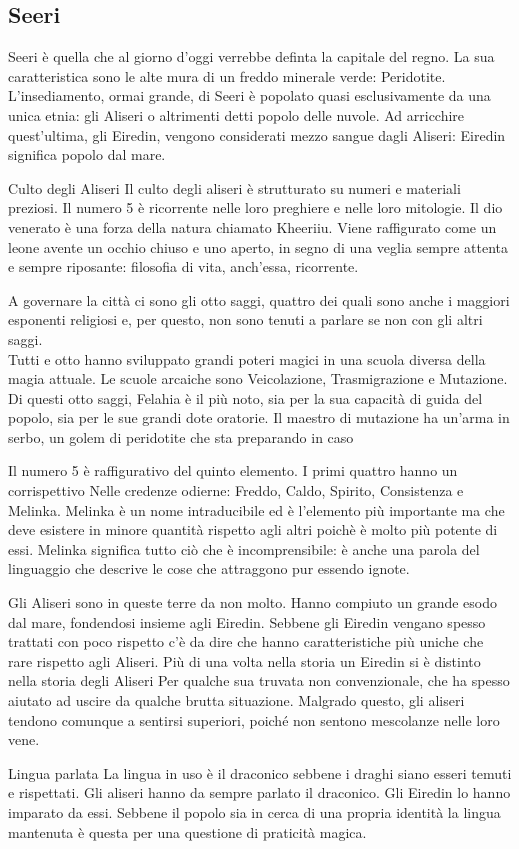 \subsection{Seeri}
Seeri \`e quella che al giorno d'oggi verrebbe definta la capitale del regno.
La sua caratteristica sono le alte mura di un freddo minerale verde: Peridotite.
L'insediamento, ormai grande, di Seeri \`e popolato quasi esclusivamente da una unica etnia:
gli Aliseri o altrimenti detti popolo delle nuvole.
Ad arricchire quest'ultima, gli Eiredin, vengono considerati mezzo sangue
dagli Aliseri: Eiredin significa popolo dal mare.
\begin{commentbox}{Culto degli Aliseri}
  Il culto degli aliseri \`e strutturato su numeri e materiali preziosi. Il numero 5 \`e
  ricorrente nelle loro preghiere e nelle loro mitologie. Il dio venerato \`e una forza
  della natura chiamato Kheeriiu. Viene raffigurato come un leone avente un occhio chiuso
  e uno aperto, in segno di una veglia sempre attenta e sempre riposante: filosofia di vita,
  anch'essa, ricorrente.
\end{commentbox}
A governare la citt\`a ci sono gli otto saggi, quattro dei quali sono anche i maggiori esponenti
religiosi e, per questo, non sono tenuti a parlare se non con gli altri saggi.\\
Tutti e otto hanno sviluppato grandi poteri magici in una scuola diversa della magia attuale.
Le scuole arcaiche sono Veicolazione, Trasmigrazione e Mutazione.
Di questi otto saggi, Felahia \`e il pi\`u noto, sia per la sua capacit\`a di guida
del popolo, sia per le sue grandi dote oratorie.
Il maestro di mutazione ha un'arma in serbo, un golem di peridotite che sta preparando
in caso 
\begin{commentbox}{5}
  Il numero 5 \`e raffigurativo del quinto elemento. I primi quattro hanno un corrispettivo
  Nelle credenze odierne: Freddo, Caldo, Spirito, Consistenza e Melinka.
  Melinka \`e un nome intraducibile ed \`e l'elemento pi\`u importante ma che deve esistere
  in minore quantit\`a rispetto agli altri poich\`e \`e molto pi\`u potente di essi.
  Melinka significa tutto ci\`o che \`e incomprensibile: \`e anche una parola del
  linguaggio che descrive le cose che attraggono pur essendo ignote.
\end{commentbox}
Gli Aliseri sono in queste terre da non molto. Hanno compiuto un grande esodo dal mare,
fondendosi insieme agli Eiredin. Sebbene gli Eiredin vengano spesso trattati con poco
rispetto c'\`e da dire che hanno caratteristiche pi\`u uniche che rare rispetto agli Aliseri.
Pi\`u di una volta nella storia un Eiredin si \`e distinto nella storia degli Aliseri
Per qualche sua truvata non convenzionale, che ha spesso aiutato ad uscire da qualche
brutta situazione. Malgrado questo, gli aliseri tendono comunque a sentirsi superiori, poich\'e
non sentono mescolanze nelle loro vene.
\begin{commentbox}{Lingua parlata}
  La lingua in uso \`e il draconico sebbene i draghi siano esseri temuti e rispettati.
  Gli aliseri hanno da sempre parlato il draconico. Gli Eiredin lo hanno imparato da essi.
  Sebbene il popolo sia in cerca di una propria identit\`a la lingua mantenuta \`e questa
  per una questione di praticit\`a magica.
\end{commentbox}